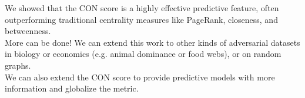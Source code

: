\documentclass[preview]{standalone}
\begin{document}
We showed that the CON score is a highly effective predictive feature, often outperforming traditional centrality measures like PageRank, closeness, and betweenness.\\More can be done! We can extend this work to other kinds of adversarial datasets in biology or economics (e.g. animal dominance or food webs), or on random graphs.\\We can also extend the CON score to provide predictive models with more information and globalize the metric.\\
\end{document}
